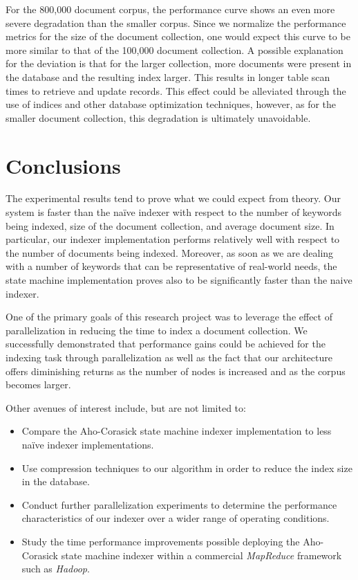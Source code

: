 \documentclass[10pt]{article}
\begin{document}
For the 800,000 document corpus, the performance curve shows an even
more severe degradation than the smaller corpus. Since we normalize
the performance metrics for the size of the document collection, one
would expect this curve to be more similar to that of the 100,000
document collection. A possible explanation for the deviation is that
for the larger collection, more documents were present in the
database and the resulting index larger. This results in longer table
scan times to retrieve and update records. This effect could be
alleviated through the use of indices and other database optimization
techniques, however, as for the smaller document
collection, this degradation is ultimately unavoidable.


\section{Conclusions}
\label{sec:conclusions}
The experimental results tend to prove what we could expect from
theory. Our system is faster than the na\"{i}ve indexer with respect
to the number of keywords being indexed, size of the document
collection, and average document size. In particular, our indexer
implementation performs relatively well with respect to the number of
documents being indexed. Moreover, as soon as we are dealing with a number of
keywords that can be representative of real-world needs, the state
machine implementation proves also to be significantly faster than the
naive indexer. 

One of the primary goals of this research project was to leverage the
effect of parallelization in reducing the time to index a document
collection. We successfully demonstrated that performance gains could
be achieved for the indexing task through parallelization as well as
the fact that our architecture offers diminishing returns as the
number of nodes is increased and as the corpus becomes larger.

 Other avenues of interest include, but are not limited
to:

\begin{itemize}
  \item Compare the Aho-Corasick state machine indexer implementation
    to less na\"{i}ve indexer implementations.
    
    \item Use compression techniques to our algorithm in order to
      reduce the index size in the database.

      \item Conduct further parallelization experiments to determine
        the performance characteristics of our indexer over a wider
        range of operating conditions.

    \item Study the time performance improvements possible deploying
      the Aho-Corasick state machine indexer within a commercial
      \textit{MapReduce} framework such as \textit{Hadoop}.
\end{itemize}



\renewcommand\bibname{References}


\end{document}
